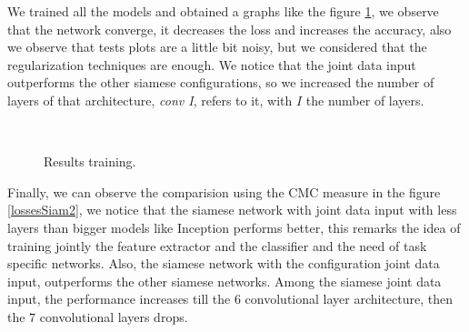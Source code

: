 We trained all the models and obtained a graphs like the figure \ref{lossesSiam}, we observe that the network converge, it decreases the loss and increases the accuracy, also we observe that tests plots are a little bit noisy, but we considered that the  regularization techniques are enough. We notice that the joint data input outperforms the other siamese configurations, so we increased the number of layers of that architecture, \textit{conv I}, refers to it, with $I$ the number of layers.

\begin{figure}[H]
		
\centering

\\

\caption{Results training.}
\label{lossesSiam}
\end{figure}



Finally, we can observe the comparision using the CMC measure in the figure \ref{lossesSiam2}, we notice that the siamese network with joint data input with less layers than bigger models like Inception performs better, this remarks the idea of training jointly the feature extractor and the classifier and the need of task specific networks. Also, the siamese network with the configuration joint data input, outperforms the other siamese networks. Among the siamese joint data input, the performance increases till the $6$ convolutional layer architecture, then the $7$ convolutional layers drops.

